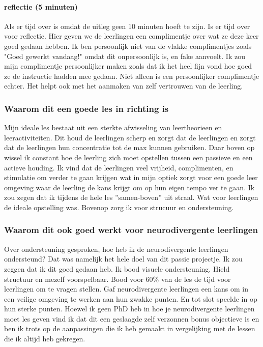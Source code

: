 \documentclass{article}
\begin{document}
                \bigskip\noindent\paragraph{reflectie (5 minuten)}
                    
                    Als er tijd over is omdat de uitleg geen 10 minuten hoeft te zijn. Is er tijd over voor reflectie. Hier geven we de leerlingen een complimentje over wat ze deze keer goed gedaan hebben. Ik ben persoonlijk niet van de vlakke complimentjes zoals "Goed gewerkt vandaag!" omdat dit onpersoonlijk is, en fake aanvoelt. Ik zou mijn complimentje persoonlijker maken zoals dat ik het heel fijn vond hoe goed ze de instructie hadden mee gedaan. Niet alleen is een persoonlijker complimentje echter. Het helpt ook met het aanmaken van zelf vertrouwen van de leerling.\cite{compliments-how-to}

            \subsubsection{Waarom dit een goede les in richting is}
                
                Mijn ideale les bestaat uit een sterkte afwisseling van leertheorieen en leeractiviteiten. Dit houd de leerlingen scherp en zorgt dat de leerlingen en zorgt dat de leerlingen hun concentratie tot de max kunnen gebruiken. Daar boven op wissel ik constant hoe de leerling zich moet opstellen tussen een passieve en een actieve houding. Ik vind dat de leerlingen veel vrijheid, complimenten, en stimulatie om verder te gaan krijgen wat in mijn optiek zorgt voor een goede leer omgeving waar de leerling de kans krijgt om op hun eigen tempo ver te gaan. Ik zou zegen dat ik tijdens de hele les ”samen-boven” uit straal. Wat voor leerlingen de ideale opstelling was.\cite{samen-boven-leads-to-better-results} Bovenop zorg ik voor strucuur en ondersteuning.
            
            \subsubsection{Waarom dit ook goed werkt voor neurodivergente leerlingen}
            
                Over ondersteuning gesproken, hoe heb ik de neurodivergente leerlingen ondersteund? Dat was namelijk het hele doel van dit passie projectje. Ik zou zeggen dat ik dit goed gedaan heb. Ik bood visuele ondersteuning. Hield structuur en mezelf voorspelbaar. Bood voor 60\% van de les de tijd voor leerlingen om te vragen stellen. Gaf neurodivergente leerlingen een kans om in een veilige omgeving te werken aan hun zwakke punten. En tot slot speelde in op hun sterke punten. Hoewel ik geen PhD heb in hoe je neurodivergente leerlingen moet les geven vind ik dat dit een geslaagde zelf verzonnen bonus objectieve is en ben ik trots op de aanpassingen die ik heb gemaakt in vergelijking met de lessen die ik altijd heb gekregen.
\end{document}
